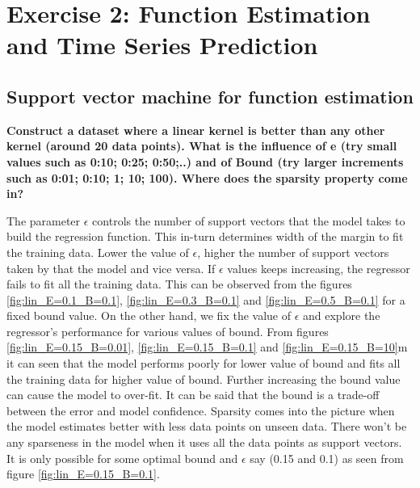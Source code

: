 \chapter{Exercise 2: Function Estimation and Time Series Prediction}

\section{Support vector machine for function estimation}
\textbf{Construct a dataset where a linear kernel is better than any other kernel (around 20
	data points). What is the influence of e (try small values such as 0:10; 0:25; 0:50;..)
	and of Bound (try larger increments such as 0:01; 0:10; 1; 10; 100). Where does the
	sparsity property come in?}

The parameter $\epsilon$ controls the number of support vectors that the model takes to build the regression function. This in-turn determines width of the margin to fit the training data. Lower the value of $\epsilon$, higher the number of support vectors taken by that the model and vice versa. If $\epsilon$ values keeps increasing, the regressor fails to fit all the training data. This can be observed from the figures \ref{fig:lin_E=0.1_B=0.1}, \ref{fig:lin_E=0.3_B=0.1} and \ref{fig:lin_E=0.5_B=0.1} for a fixed bound value. On the other hand, we fix the value of $\epsilon$ and explore the regressor's performance for various values of bound. From figures \ref{fig:lin_E=0.15_B=0.01}, \ref{fig:lin_E=0.15_B=0.1} and \ref{fig:lin_E=0.15_B=10}m it can seen that the model performs poorly for lower value of bound and fits all the training data for higher value of bound.  Further increasing the bound value can cause the model to over-fit. It can be said that the bound is a trade-off between the error and model confidence. Sparsity comes into the picture when the model estimates better with less data points on unseen data. There won't be any sparseness in the model when it uses all the data points as support vectors. It is only possible for some optimal bound and $\epsilon$ say (0.15 and 0.1) as seen from figure \ref{fig:lin_E=0.15_B=0.1}.
